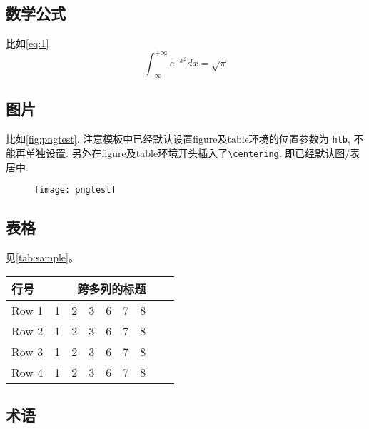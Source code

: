 \subsection{数学公式}

比如\autoref{eq:1}
\begin{equation}
    \label{eq:1}
    \int_{-\infty}^{+\infty} e^{-x^2} dx = \sqrt{\pi}
\end{equation}

\subsection{图片}

比如\autoref{fig:pngtest}. 注意模板中已经默认设置figure及table环境的位置参数为
\verb|htb|, 不能再单独设置. 另外在figure及table环境开头插入了\verb|\centering|,
即已经默认图/表居中.
\begin{figure}
    \texttt{[image: pngtest]}
    \label{fig:pngtest}
\end{figure}

\subsection{表格}

见\autoref{tab:sample}。
\begin{table}
    \label{tab:sample}
    \setlength{\tabcolsep}{3pt}%
    \renewcommand{\arraystretch}{1.2}%
    \begin{tabular}{lcccccccc}
        \toprule
        行号 & \multicolumn{8}{c}{跨多列的标题}\\
        \midrule
        Row 1 & 1 & 2 & 3 & 6 & 7 & 8 \\
        Row 2 & 1 & 2 & 3 & 6 & 7 & 8 \\
        Row 3 & 1 & 2 & 3 & 6 & 7 & 8 \\
        Row 4 & 1 & 2 & 3 & 6 & 7 & 8 \\
        \bottomrule
    \end{tabular}
\end{table}

\subsection{术语}

